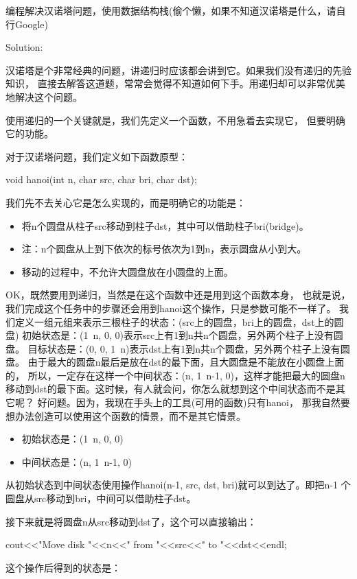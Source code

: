 \begin{description}
编程解决汉诺塔问题，使用数据结构栈(偷个懒，如果不知道汉诺塔是什么，请自行Google)

Solution: 

汉诺塔是个非常经典的问题，讲递归时应该都会讲到它。如果我们没有递归的先验知识， 直接去解答这道题，常常会觉得不知道如何下手。用递归却可以非常优美地解决这个问题。

使用递归的一个关键就是，我们先定义一个函数，不用急着去实现它， 但要明确它的功能。

对于汉诺塔问题，我们定义如下函数原型：

void hanoi(int n, char src, char bri, char dst);

我们先不去关心它是怎么实现的，而是明确它的功能是：
\begin{itemize}
\item 将n个圆盘从柱子src移动到柱子dst，其中可以借助柱子bri(bridge)。
\item 注：n个圆盘从上到下依次的标号依次为1到n，表示圆盘从小到大。
\item 移动的过程中，不允许大圆盘放在小圆盘的上面。
\end{itemize}

OK，既然要用到递归，当然是在这个函数中还是用到这个函数本身， 也就是说，我们完成这个任务中的步骤还会用到hanoi这个操作，只是参数可能不一样了。 我们定义一组元组来表示三根柱子的状态：(src上的圆盘，bri上的圆盘，dst上的圆盘) 初始状态是：(1~n, 0, 0)表示src上有1到n共n个圆盘，另外两个柱子上没有圆盘。 目标状态是：(0, 0, 1~n)表示dst上有1到n共n个圆盘，另外两个柱子上没有圆盘。 由于最大的圆盘n最后是放在dst的最下面，且大圆盘是不能放在小圆盘上面的， 所以，一定存在这样一个中间状态：(n, 1~n-1, 0)，这样才能把最大的圆盘n 移动到dst的最下面。这时候，有人就会问，你怎么就想到这个中间状态而不是其它呢？ 好问题。因为，我现在手头上的工具(可用的函数)只有hanoi， 那我自然要想办法创造可以使用这个函数的情景，而不是其它情景。

\begin{itemize}
\item 初始状态是：(1~n, 0, 0)
\item 中间状态是：(n, 1~n-1, 0)
\end{itemize}

从初始状态到中间状态使用操作hanoi(n-1, src, dst, bri)就可以到达了。即把n-1 个圆盘从src移动到bri，中间可以借助柱子dst。

接下来就是将圆盘n从src移动到dst了，这个可以直接输出：

cout<<"Move disk "<<n<<" from "<<src<<" to "<<dst<<endl;

这个操作后得到的状态是：


\end{description}

